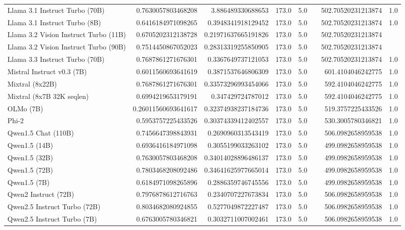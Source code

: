 \begin{table}[htp]
{\begin{tabular}{lrrrrrrr}
Llama 3.1 Instruct Turbo (70B) & 0.7630057803468208 & 3.886489330688653 & 173.0 & 5.0 &  & 502.70520231213874 & 1.0 \\
Llama 3.1 Instruct Turbo (8B) & 0.6416184971098265 & 0.3948341918129452 & 173.0 & 5.0 &  & 502.70520231213874 & 1.0 \\
Llama 3.2 Vision Instruct Turbo (11B) & 0.6705202312138728 & 0.21971637665191826 & 173.0 & 5.0 &  & 502.70520231213874 &  \\
Llama 3.2 Vision Instruct Turbo (90B) & 0.7514450867052023 & 0.28313319255850905 & 173.0 & 5.0 &  & 502.70520231213874 &  \\
Llama 3.3 Instruct Turbo (70B) & 0.7687861271676301 & 0.3367649737121053 & 173.0 & 5.0 &  & 502.70520231213874 & 1.0 \\
Mistral Instruct v0.3 (7B) & 0.6011560693641619 & 0.3871537646806309 & 173.0 & 5.0 &  & 601.4104046242775 & 1.0 \\
Mixtral (8x22B) & 0.7687861271676301 & 0.33573296993454066 & 173.0 & 5.0 &  & 592.4104046242775 & 1.0 \\
Mixtral (8x7B 32K seqlen) & 0.6994219653179191 & 0.347429724787012 & 173.0 & 5.0 &  & 592.4104046242775 & 1.0 \\
OLMo (7B) & 0.26011560693641617 & 0.32374938237184736 & 173.0 & 5.0 &  & 519.3757225433526 & 1.0 \\
Phi-2 & 0.5953757225433526 & 0.30374339412402557 & 173.0 & 5.0 &  & 530.3005780346821 & 1.0 \\
Qwen1.5 Chat (110B) & 0.7456647398843931 & 0.2690960313543419 & 173.0 & 5.0 &  & 506.0982658959538 & 1.0 \\
Qwen1.5 (14B) & 0.6936416184971098 & 0.3055199033263102 & 173.0 & 5.0 &  & 499.0982658959538 & 1.0 \\
Qwen1.5 (32B) & 0.7630057803468208 & 0.34014028896486137 & 173.0 & 5.0 &  & 499.0982658959538 & 1.0 \\
Qwen1.5 (72B) & 0.7803468208092486 & 0.34641625977665014 & 173.0 & 5.0 &  & 499.0982658959538 & 1.0 \\
Qwen1.5 (7B) & 0.6184971098265896 & 0.2886359746745556 & 173.0 & 5.0 &  & 499.0982658959538 & 1.0 \\
Qwen2 Instruct (72B) & 0.7976878612716763 & 0.2340707227673834 & 173.0 & 5.0 &  & 506.0982658959538 & 1.0 \\
Qwen2.5 Instruct Turbo (72B) & 0.8034682080924855 & 0.5277049872227487 & 173.0 & 5.0 &  & 506.0982658959538 & 1.0 \\
Qwen2.5 Instruct Turbo (7B) & 0.6763005780346821 & 0.3032711007002461 & 173.0 & 5.0 &  & 506.0982658959538 & 1.0 \\

\end{tabular}}
\end{table}
